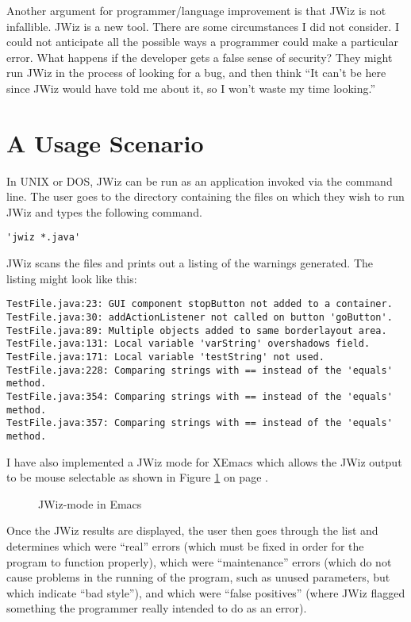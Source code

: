 Another argument for programmer/language improvement is that JWiz is not
infallible. JWiz is a new tool.  There are some circumstances I did not
consider. I could not anticipate all the possible ways a programmer could
make a particular error.  What happens if the developer gets a false sense
of security?  They might run JWiz in the process of looking for a bug, and
then think ``It can't be here since JWiz would have told me about it, so I
won't waste my time looking.''

\section{A Usage Scenario}
In UNIX or DOS, JWiz can be run as an application invoked via the command
line.  The user goes to the directory containing the files on which they
wish to run JWiz and types the following command.
\begin{verbatim}
'jwiz *.java'
\end{verbatim}
JWiz scans the files and prints out a listing of the warnings generated.
The listing might look like this:

\begin{verbatim}
TestFile.java:23: GUI component stopButton not added to a container. 
TestFile.java:30: addActionListener not called on button 'goButton'.
TestFile.java:89: Multiple objects added to same borderlayout area.
TestFile.java:131: Local variable 'varString' overshadows field.
TestFile.java:171: Local variable 'testString' not used.
TestFile.java:228: Comparing strings with == instead of the 'equals'
method. 
TestFile.java:354: Comparing strings with == instead of the 'equals'
method. 
TestFile.java:357: Comparing strings with == instead of the 'equals'
method. 
\end{verbatim}

I have also implemented a JWiz mode for XEmacs which allows the JWiz output
to be mouse selectable as shown in Figure \ref{emacs} on page \pageref{emacs}.

\begin{figure}[tbp]%
  {\centerline{}}
  \caption{\label{emacs} JWiz-mode in Emacs}
\end{figure}

Once the JWiz results are displayed, the user then goes through the list
and determines which were ``real'' errors (which must be fixed in order for
the program to function properly), which were ``maintenance'' errors (which
do not cause problems in the running of the program, such as unused
parameters, but which indicate ``bad style''), and which were ``false
positives'' (where JWiz flagged something the programmer really intended to
do as an error).

